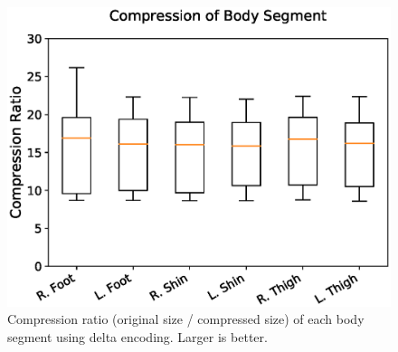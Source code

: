 \documentclass[journal]{IEEEtran}
\begin{document}
\begin{figure}

  \includegraphics[width=\linewidth]{segment.eps}
  \caption{Compression ratio (original size / compressed size) of each body segment using delta encoding. Larger is better.}
  \label{fig:segments}
  
\end{figure}

\end{document}
